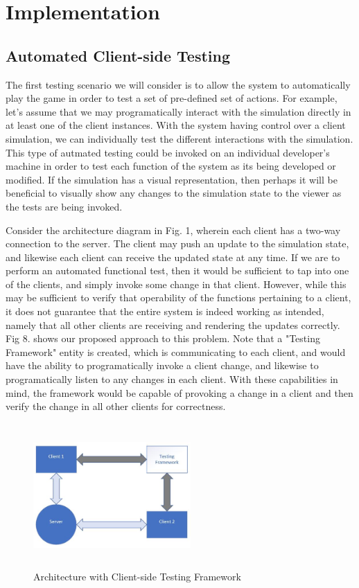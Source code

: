 \documentclass[conference]{IEEEtran}
\begin{document}
\section{Implementation}


\subsection{Automated Client-side Testing}

The first testing scenario we will consider is to allow the system to automatically play the game in order to test a set of pre-defined set of actions.
For example, let's assume that we may programatically interact with the simulation directly in at least one of the client instances. With the system having control over a client simulation, 
we can individually test the different interactions with the simulation. This type of autmated testing could be invoked on an individual developer's 
machine in order to test each function of the system as its being developed or modified. If the simulation has a visual representation, then perhaps it will be beneficial to 
visually show any changes to the simulation state to the viewer as the tests are being invoked.  

Consider the architecture diagram in Fig. 1, wherein each client has a two-way connection to the server. The client may push an update to the simulation state, and likewise each
client can receive the updated state at any time. If we are to perform an automated functional test, then it would be sufficient to tap into one of the clients, and simply invoke 
some change in that client. However, while this may be sufficient to verify that operability of the functions pertaining to a client, it does not guarantee that the entire system 
is indeed working as intended, namely that all other clients are receiving and rendering the updates correctly. Fig 8. shows our proposed approach to this problem. Note that a "Testing Framework"
entity is created, which is communicating to each client, and would have the ability to programatically invoke a client change, and likewise to programatically listen to any changes in each client.
With these capabilities in mind, the framework would be capable of provoking a change in a client and then verify the change in all other clients for correctness. 


\begin{figure}[htbp]
\centerline{\includegraphics [width = 6cm, height = 5.5cm] {images/ClientSideFrameworkDiagram.jpg}}
\caption{Architecture with Client-side Testing Framework}
\end{figure}
\end{document}

